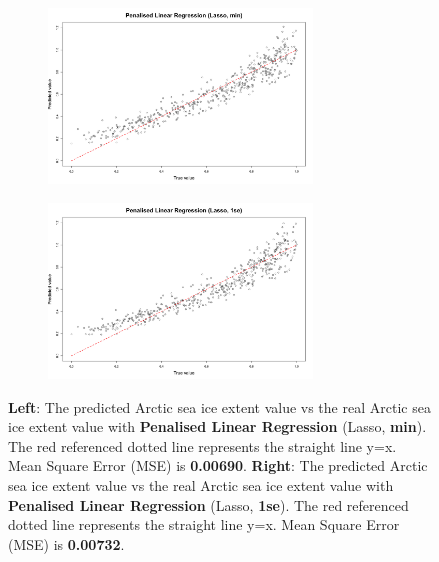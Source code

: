 \begin{figure}[htbp]
\center
  \begin{subfigure}{7.5cm}
    \centering\includegraphics[width=7cm]{Figure/4.2.2-PLR-min.png}
  \end{subfigure}
  \begin{subfigure}{7.5cm}
    \centering\includegraphics[width=7cm]{Figure/4.2.2-PLR-1se.png}
  \end{subfigure}
  \caption{\textbf{Left}: The predicted Arctic sea ice extent value vs the real Arctic sea ice extent value with \textbf{Penalised Linear Regression} (Lasso, \textbf{min}). The red referenced dotted line represents the straight line y=x. Mean Square Error (MSE) is \textbf{0.00690}. \textbf{Right}: The predicted Arctic sea ice extent value vs the real Arctic sea ice extent value with \textbf{Penalised Linear Regression} (Lasso, \textbf{1se}). The red referenced dotted line represents the straight line y=x. Mean Square Error (MSE) is \textbf{0.00732}.}
  \label{4.2.2-PLR-min-1se}
\end{figure}

\newpage